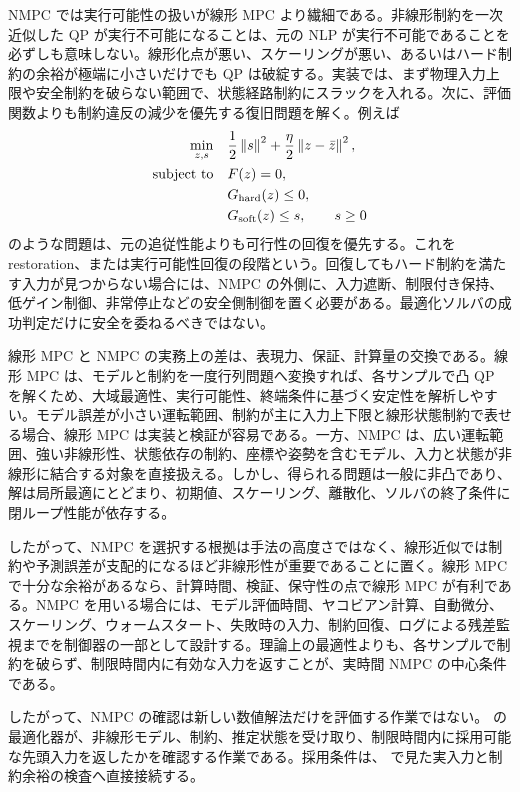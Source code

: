 NMPC では実行可能性の扱いが線形 MPC より繊細である。非線形制約を一次近似した QP が実行不可能になることは、元の NLP が実行不可能であることを必ずしも意味しない。線形化点が悪い、スケーリングが悪い、あるいはハード制約の余裕が極端に小さいだけでも QP は破綻する。実装では、まず物理入力上限や安全制約を破らない範囲で、状態経路制約にスラックを入れる。次に、評価関数よりも制約違反の減少を優先する復旧問題を解く。例えば
\begin{align}
  \min_{z,s}\quad &
  \frac{1}{2}\left\|s\right\|^{2}
  +\frac{\eta}{2}\left\|z-\bar{z}\right\|^{2},\\
  \text{subject to}\quad &
  F(z)=0,\\
  &G_{\mathrm{hard}}(z)\le0,\\
  &G_{\mathrm{soft}}(z)\le s,\qquad s\ge0
\end{align}
のような問題は、元の追従性能よりも可行性の回復を優先する。これを restoration、または実行可能性回復の段階という。回復してもハード制約を満たす入力が見つからない場合には、NMPC の外側に、入力遮断、制限付き保持、低ゲイン制御、非常停止などの安全側制御を置く必要がある。最適化ソルバの成功判定だけに安全を委ねるべきではない。

線形 MPC と NMPC の実務上の差は、表現力、保証、計算量の交換である。線形 MPC は、モデルと制約を一度行列問題へ変換すれば、各サンプルで凸 QP を解くため、大域最適性、実行可能性、終端条件に基づく安定性を解析しやすい。モデル誤差が小さい運転範囲、制約が主に入力上下限と線形状態制約で表せる場合、線形 MPC は実装と検証が容易である。一方、NMPC は、広い運転範囲、強い非線形性、状態依存の制約、座標や姿勢を含むモデル、入力と状態が非線形に結合する対象を直接扱える。しかし、得られる問題は一般に非凸であり、解は局所最適にとどまり、初期値、スケーリング、離散化、ソルバの終了条件に閉ループ性能が依存する。

したがって、NMPC を選択する根拠は手法の高度さではなく、線形近似では制約や予測誤差が支配的になるほど非線形性が重要であることに置く。線形 MPC で十分な余裕があるなら、計算時間、検証、保守性の点で線形 MPC が有利である。NMPC を用いる場合には、モデル評価時間、ヤコビアン計算、自動微分、スケーリング、ウォームスタート、失敗時の入力、制約回復、ログによる残差監視までを制御器の一部として設計する。理論上の最適性よりも、各サンプルで制約を破らず、制限時間内に有効な入力を返すことが、実時間 NMPC の中心条件である。

したがって、NMPC の確認は新しい数値解法だけを評価する作業ではない。 の最適化器が、非線形モデル、制約、推定状態を受け取り、制限時間内に採用可能な先頭入力を返したかを確認する作業である。採用条件は、 で見た実入力と制約余裕の検査へ直接接続する。

